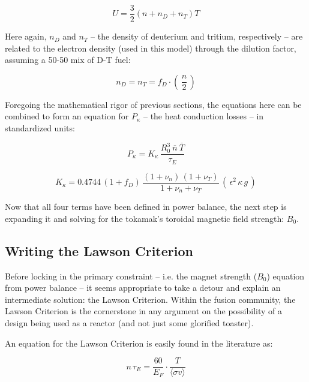 \documentclass[11pt]{book}
\begin{document}
\begin{equation}
	U = \frac{3}{2} \left( n + n_D + n_T \right) T
\end{equation}

Here again, $n_D$ and $n_T$ -- the density of deuterium and tritium, respectively -- are related to the electron density (used in this model) through the dilution factor, assuming a 50-50 mix of D-T fuel:

\begin{equation}
	n_D = n_T = f_D \cdot \left( \, \frac{n}{2} \, \right)
\end{equation}

Foregoing the mathematical rigor of previous sections, the equations here can be combined to form an equation for $P_\kappa$ -- the heat conduction losses -- in standardized units:

\begin{equation}
	\label{eq:pkappa}
	P_\kappa = K_\kappa \, \frac{ R_0 ^ 3 \ \overline{n}  \ \overline{T}  }{\tau_E} 
\end{equation}

\begin{equation}
	K_\kappa = 0.4744 \, ( 1 + f_D ) \, \frac{ (1 + \nu_n) \, (1 + \nu_T) }{1 + \nu_n + \nu_T } \, ( \, \epsilon^2 \, \kappa \, g \, )
\end{equation}

Now that all four terms have been defined in power balance, the next step is expanding it and solving for the tokamak's toroidal magnetic field strength: $B_0$.

\subsection{Writing the Lawson Criterion}

Before locking in the primary constraint -- i.e. the magnet strength ($B_0$) equation from power balance -- it seems appropriate to take a detour and explain an intermediate solution: the Lawson Criterion. Within the fusion community, the Lawson Criterion is the cornerstone in any argument on the possibility of a design being used as a reactor (and not just some glorified toaster). 

An equation for the Lawson Criterion is easily found in the literature as:

\begin{equation}
	\label{eq:lawson}
	n \, \tau_E = \frac{ 60 }{ E_F } \cdot \frac{ T }{ \langle \sigma v \rangle }
\end{equation}
\end{document}
